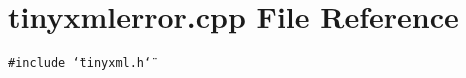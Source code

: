 \section{tinyxmlerror.cpp File Reference}
\label{tinyxmlerror_8cpp}


{\tt \#include \char`\"{}tinyxml.h\char`\"{}}\par
